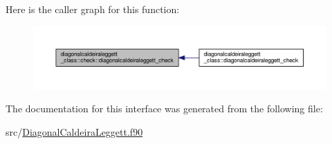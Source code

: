 Here is the caller graph for this function\+:\nopagebreak
\begin{figure}[H]
\begin{center}
\leavevmode
\includegraphics[width=350pt]{interfacediagonalcaldeiraleggett__class_1_1check_ac253230808d33ac6c43158caa1fecadf_icgraph}
\end{center}
\end{figure}




The documentation for this interface was generated from the following file\+:\begin{DoxyCompactItemize}
\item 
src/\hyperlink{_diagonal_caldeira_leggett_8f90}{Diagonal\+Caldeira\+Leggett.\+f90}\end{DoxyCompactItemize}
